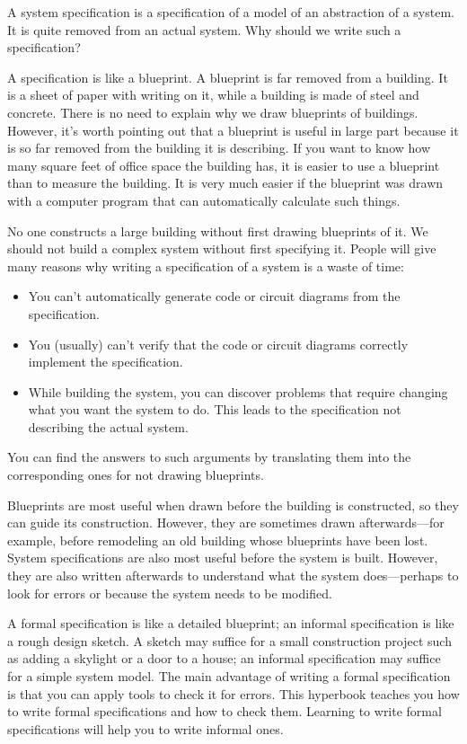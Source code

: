 \documentclass[fleqn,leqno]{article}
\begin{document}
A system specification is a specification of a model of an abstraction
of a system.  It is quite removed from an actual system.  Why should
we write such a specification?

A specification is like a 
blueprint.  A blueprint is far removed from a building.  It is a sheet
of paper with writing on it, while a building is made of steel and
concrete.  There is no need to explain why we draw blueprints of
buildings.  However, it's worth pointing out that a blueprint is
useful in large part because it is so far removed from the building it
is describing.  If you want to know how many square feet of office
space the building has, it is easier to use a blueprint than to
measure the building.  It is very much easier if the blueprint was
drawn with a computer program that can automatically calculate such
things.

No one constructs a large building without first drawing blueprints of
it.  We should not build a complex system without first specifying it.
People will give many reasons why writing a specification of a
system is a waste of time:
\begin{itemize}
\item You can't automatically generate code or circuit diagrams from
the specification.

\item You (usually) can't verify that the code or circuit diagrams
correctly implement the specification.

\item While building the system, you can discover problems that
require changing what you want the system to do.  This leads to the
specification not describing the actual system.
\end{itemize}
You can find the answers to such arguments by translating them into
the corresponding ones for not drawing blueprints.

Blueprints are most useful when drawn before the building is
constructed, so they can guide its construction.  However, they are
sometimes drawn afterwards---for example, before remodeling an old
building whose blueprints have been lost.  System specifications are
also most useful before the system is built.  However, they are also
written afterwards to understand what the system does---perhaps to
look for errors or because the system needs to be modified.

A formal specification is like a detailed blueprint; an informal
specification is like a rough design sketch.  A sketch may suffice for
a small construction project such as adding a skylight or a door to a
house; an informal specification may suffice for a simple system model.
The main advantage of writing a formal specification is that you can
apply tools to check it for errors.  This hyperbook teaches you how to
write formal specifications and how to check them.  Learning to write
formal specifications will help you to write informal ones.
\end{document}
